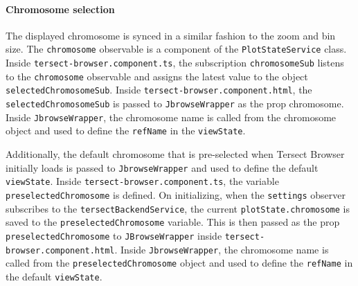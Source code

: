 \documentclass[12pt]{article}
\begin{document}
\begin{itemize}
\paragraph{Chromosome selection}
The displayed chromosome is synced in a similar fashion to the zoom and bin size. The \verb +chromosome+ observable is a component of the \verb +PlotStateService+ class. Inside \verb +tersect-browser.component.ts+, the subscription \verb +chromosomeSub+ listens to the \verb +chromosome+ observable and assigns the latest value to the object \verb +selectedChromosomeSub+. Inside \verb +tersect-browser.component.html+, the \verb +selectedChromosomeSub+ is passed to \verb +JbrowseWrapper+ as the prop chromosome. Inside \verb +JbrowseWrapper+, the chromosome name is called from the chromosome object and used to define the \verb +refName+ in the \verb +viewState+. 

Additionally, the default chromosome that is pre-selected when Tersect Browser initially loads is passed to \verb +JbrowseWrapper+ and used to define the default \verb +viewState+. Inside \verb +tersect-browser.component.ts+, the variable \verb +preselectedChromosome+ is defined. On initializing, when the \verb +settings+ observer subscribes to the \verb +tersectBackendService+, the current \verb +plotState.chromosome+ is saved to the \verb +preselectedChromosome+ variable. This is then passed as the prop \verb +preselectedChromosome+ to \verb +JBrowseWrapper+ inside \verb +tersect-browser.component.html+.  Inside \verb +JbrowseWrapper+, the chromosome name is called from the \verb +preselectedChromosome+ object and used to define the \verb +refName+ in the default \verb +viewState+. 



\end{itemize}
\end{document}
